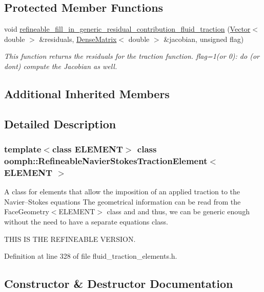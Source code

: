 \subsection*{Protected Member Functions}
\begin{DoxyCompactItemize}
\item 
void \hyperlink{classoomph_1_1RefineableNavierStokesTractionElement_a0de3c98cabf491ff91a7daefab16505e}{refineable\+\_\+fill\+\_\+in\+\_\+generic\+\_\+residual\+\_\+contribution\+\_\+fluid\+\_\+traction} (\hyperlink{classoomph_1_1Vector}{Vector}$<$ double $>$ \&residuals, \hyperlink{classoomph_1_1DenseMatrix}{Dense\+Matrix}$<$ double $>$ \&jacobian, unsigned flag)
\begin{DoxyCompactList}\small\item\em This function returns the residuals for the traction function. flag=1(or 0)\+: do (or don\textquotesingle{}t) compute the Jacobian as well. \end{DoxyCompactList}\end{DoxyCompactItemize}
\subsection*{Additional Inherited Members}


\subsection{Detailed Description}
\subsubsection*{template$<$class E\+L\+E\+M\+E\+NT$>$\newline
class oomph\+::\+Refineable\+Navier\+Stokes\+Traction\+Element$<$ E\+L\+E\+M\+E\+N\+T $>$}

A class for elements that allow the imposition of an applied traction to the Navier--Stokes equations The geometrical information can be read from the Face\+Geometry$<$\+E\+L\+E\+M\+E\+N\+T$>$ class and and thus, we can be generic enough without the need to have a separate equations class.

T\+H\+IS IS T\+HE R\+E\+F\+I\+N\+E\+A\+B\+LE V\+E\+R\+S\+I\+ON. 

Definition at line 328 of file fluid\+\_\+traction\+\_\+elements.\+h.



\subsection{Constructor \& Destructor Documentation}
\mbox{\label{classoomph_1_1RefineableNavierStokesTractionElement_ac3f4ca74a1c159962de935ffd1da46e9}} 
